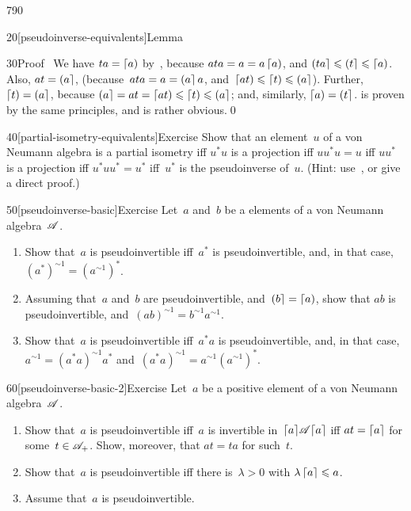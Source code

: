 \begin{parsec}{790}
\begin{point}{20}[pseudoinverse-equivalents]{Lemma}
\begin{point}{30}{Proof}
\grayed{(\ref{pseudoinverse-2}$
	\Longrightarrow$%
\ref{pseudoinverse-5})}\ 
We have $ta=\left\lceil a\right)$ by~,
because $ata=a=a\left\lceil a\right)$,
	and $\left(ta\right\rceil\leqslant\left(t\right\rceil\leqslant\left\lceil a\right)$.
Also, $at=\left(a\right\rceil$,
(because~$ata=a=\left(a\right\rceil a$,
and~$\left\lceil at\right)\leqslant\left\lceil t\right)\leqslant \left(a\right\rceil$).
Further, $\left\lceil t\right)=\left(a\right\rceil$,
because 
	$\left(a\right\rceil=at=\left\lceil at\right)\leqslant \left\lceil t\right)\leqslant\left(a\right\rceil$;
and, similarly, $\left\lceil a\right)=\left(t\right\rceil$.
\grayed{(\ref{pseudoinverse-4}$
	\Longrightarrow$%
\ref{pseudoinverse-5})}
is proven by the same principles, and
\grayed{(\ref{pseudoinverse-5}$
	\Longrightarrow$%
\ref{pseudoinverse-1},\ref{pseudoinverse-3})}
is rather obvious.\qed
\end{point}
\end{point}
\begin{point}{40}[partial-isometry-equivalents]{Exercise}%
Show that an element~$u$ of a von Neumann algebra
is a partial isometry iff
$u^*u$ is a projection
iff $uu^*u=u$
iff $uu^*$ is a projection
iff $u^*uu^*=u^*$
iff~$u^*$ is the pseudoinverse of~$u$.
(Hint: use~,
or give a direct proof.)
\end{point}
\begin{point}{50}[pseudoinverse-basic]{Exercise}%
Let~$a$ and~$b$ be a elements of a von Neumann algebra~$\mathscr{A}$.
\begin{enumerate}
\item
Show that~$a$ is pseudoinvertible
iff~$a^*$ is pseudoinvertible,
and, in that case, $(a^*)^{\sim1}=(a^{\sim1})^*$.
\item
Assuming that~$a$ and~$b$ are pseudoinvertible,
and~$\left(b\right\rceil=\left\lceil a\right)$,
show that $ab$ is pseudoinvertible,
and~$(ab)^{\sim1}=b^{\sim1}a^{\sim1}$.


\item
Show that~$a$ is pseudoinvertible
iff~$a^*a$ is pseudoinvertible,
and, in that case, $a^{\sim 1} = (a^*a)^{\sim1}a^*$
and~$(a^*a)^{\sim1}=a^{\sim1}(a^{\sim1})^*$.
\end{enumerate}
\end{point}
\begin{point}{60}[pseudoinverse-basic-2]{Exercise}%
Let~$a$ be a positive element of a von Neumann algebra~$\mathscr{A}$.
\begin{enumerate}
\item
Show that~$a$ is pseudoinvertible iff~$a$
is invertible in~$\left\lceil a\right\rceil\!\mathscr{A}\!\left\lceil a\right\rceil$
iff $at=\left\lceil a\right\rceil$ for some~$t\in\mathscr{A}_+$.
Show, moreover, that $at=ta$ for such~$t$.
\item
Show that~$a$ is pseudoinvertible iff
there is~$\lambda>0$ with $\lambda \left\lceil a\right\rceil\leqslant a$.
\item
Assume that~$a$ is pseudoinvertible.


\end{enumerate}
\end{point}
\end{parsec}
